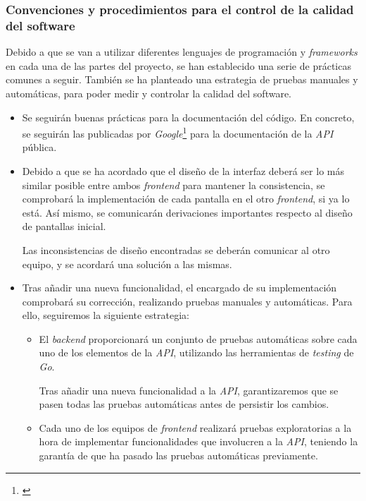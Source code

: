 \documentclass[11pt, a4paper, titlepage]{article}
\begin{document}
\subsubsection{Convenciones y procedimientos para el control de la calidad del software}

Debido a que se van a utilizar diferentes lenguajes de programación y \textit{frameworks} en cada una de las partes del proyecto, se han establecido una serie de prácticas comunes a seguir. También se ha planteado una estrategia de pruebas manuales y automáticas, para poder medir y controlar la calidad del software.

\begin{itemize}
    \item Se seguirán buenas prácticas para la documentación del código. En concreto, se seguirán las publicadas por \textit{Google}\footnote{\href{https://developers.google.com/style/api-reference-comments}{}} para la documentación de la \textit{API} pública.

    \item Debido a que se ha acordado que el diseño de la interfaz deberá ser lo más similar posible entre ambos \textit{frontend} para mantener la consistencia, se comprobará la implementación de cada pantalla en el otro \textit{frontend}, si ya lo está. Así mismo, se comunicarán derivaciones importantes respecto al diseño de pantallas inicial.
    
    Las inconsistencias de diseño encontradas se deberán comunicar al otro equipo, y se acordará una solución a las mismas.
    
    \item Tras añadir una nueva funcionalidad, el encargado de su implementación comprobará su corrección, realizando pruebas manuales y automáticas. Para ello, seguiremos la siguiente estrategia:
    \begin{itemize}
        \item El \textit{backend} proporcionará un conjunto de pruebas automáticas sobre cada uno de los elementos de la \textit{API}, utilizando las herramientas de \textit{testing} de \textit{Go}.

        Tras añadir una nueva funcionalidad a la \textit{API}, garantizaremos que se pasen todas las pruebas automáticas antes de persistir los cambios.

        \item Cada uno de los equipos de \textit{frontend} realizará pruebas exploratorias a la hora de implementar funcionalidades que involucren a la \textit{API}, teniendo la garantía de que ha pasado las pruebas automáticas previamente.
        \end{itemize}



\end{itemize}
\end{document}
